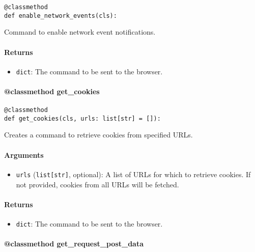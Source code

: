 \documentclass{article}
\begin{document}
\begin{lstlisting}[style=pythonstyle]
@classmethod
def enable_network_events(cls):
\end{lstlisting}

\noindent Command to enable network event notifications.

\paragraph{Returns}

\begin{itemize}
    \item \lstinline[style=pythonstyle]|dict|: The command to be sent to the browser.
\end{itemize}

\paragraph{@classmethod get\_cookies}

\begin{lstlisting}[style=pythonstyle]
@classmethod
def get_cookies(cls, urls: list[str] = []):
\end{lstlisting}

\noindent Creates a command to retrieve cookies from specified URLs.

\paragraph{Arguments}

\begin{itemize}
    \item \lstinline[style=pythonstyle]|urls| (\lstinline[style=pythonstyle]|list[str]|, optional): A list of URLs for which to retrieve cookies. If not provided, cookies from all URLs will be fetched.
\end{itemize}

\paragraph{Returns}

\begin{itemize}
    \item \lstinline[style=pythonstyle]|dict|: The command to be sent to the browser.
\end{itemize}

\paragraph{@classmethod get\_request\_post\_data}
\end{document}
